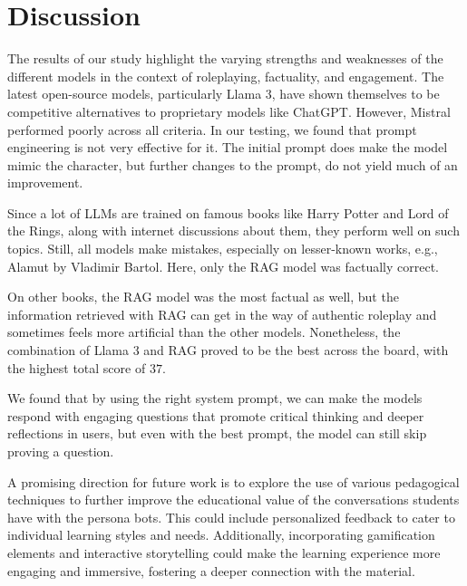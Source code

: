 \documentclass[fleqn,moreauthors,10pt]{ds_report}
\begin{document}
\section*{Discussion}

The results of our study highlight the varying strengths and weaknesses of the different models in the context of roleplaying, factuality, and engagement.
The latest open-source models, particularly Llama 3, have shown themselves to be competitive alternatives to proprietary models like ChatGPT. However, Mistral performed poorly across all criteria. In our testing, we found that
prompt engineering is not very effective for it. The initial prompt does make
the model mimic the character, but further changes to the prompt, do
not yield much of an improvement.

Since a lot of LLMs are trained on famous books like Harry Potter and Lord
of the Rings, along with internet discussions about them, they perform well on such topics. Still, all models make mistakes, especially on lesser-known
works, e.g., Alamut by Vladimir Bartol. Here, only the RAG model was factually
correct.

On other books, the RAG model was the most factual as well, but the information
retrieved with RAG can get in the way of authentic roleplay and sometimes 
feels more artificial than the other models. Nonetheless, the combination of
Llama 3 and RAG proved to be the best across the board, with the highest total
score of $37$.

We found that by using the right system prompt, we can make the models respond with engaging questions that promote critical thinking and deeper reflections in users, but even with the best prompt, the model can still skip proving
a question.

A promising direction for future work is to explore the use of various pedagogical techniques to further improve the educational value of the conversations students have with the persona bots. This could include personalized feedback to cater to individual learning styles and needs. Additionally, incorporating gamification elements and interactive storytelling could make the learning experience more engaging and immersive, fostering a deeper connection with the material.




\end{document}
